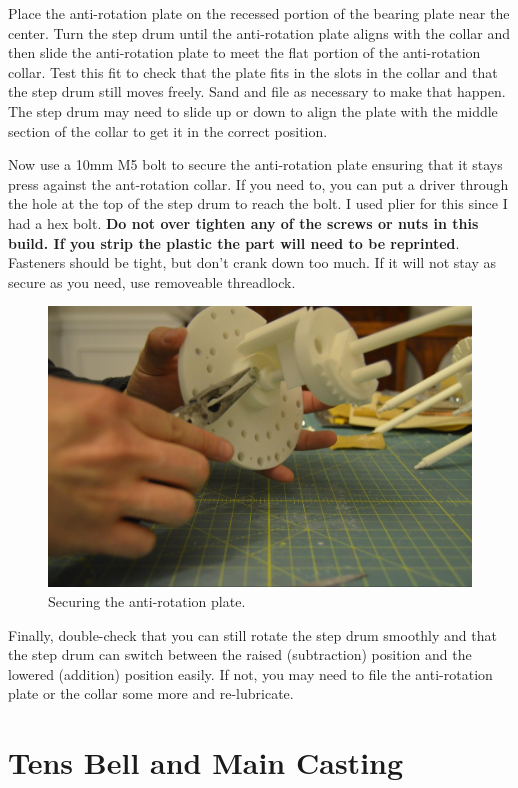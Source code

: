 \documentclass[openany]{book}
\begin{document}
Place the anti-rotation plate on the recessed portion of the bearing plate near the center. Turn the
step drum until the anti-rotation plate aligns with the collar and then slide the anti-rotation
plate to meet the flat portion of the anti-rotation collar. Test this fit to check that the plate
fits in the slots in the collar and that the step drum still moves freely. Sand and file as necessary
to make that happen. The step drum may need to slide up or down to align the plate with the middle 
section of the collar to get it in the correct position.

Now use a 10mm M5 bolt to secure the anti-rotation plate ensuring that it stays press against the
ant-rotation collar. If you need to, you can put a driver through the hole at the top of the step
drum to reach the bolt. I used plier for this since I had a hex bolt. \textbf{Do not over tighten
any of the screws or nuts in this build. If you strip the plastic the part will need to be reprinted}.
Fasteners should be tight, but don't crank down too much. If it will not stay as secure as you need,
use removeable threadlock.

\begin{figure}[!ht]
	\centering
	\includegraphics[width=.75\textwidth]{images/image28.jpg}
	\caption{Securing the anti-rotation plate.}
	\label{fig:image28}	
\end{figure}

Finally, double-check that you can still rotate the step drum smoothly and that the step drum can
switch between the raised (subtraction) position and the lowered (addition) position easily. If not,
you may need to file the anti-rotation plate or the collar some more and re-lubricate.



%

\chapter{Tens Bell and Main Casting}
\end{document}
